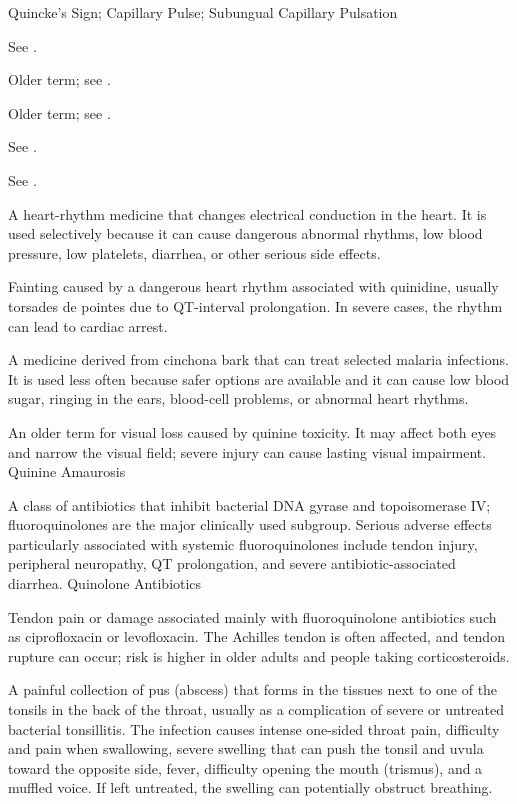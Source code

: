 \synonyms
Quincke's Sign; Capillary Pulse; Subungual Capillary Pulsation

 See .

 Older term; see .

 Older term; see .

 See .

 See .

 A heart-rhythm medicine that changes electrical conduction in the heart. It is used selectively because it can cause dangerous abnormal rhythms, low blood pressure, low platelets, diarrhea, or other serious side effects.

 Fainting caused by a dangerous heart rhythm associated with quinidine, usually torsades de pointes due to QT-interval prolongation. In severe cases, the rhythm can lead to cardiac arrest.

 A medicine derived from cinchona bark that can treat selected malaria infections. It is used less often because safer options are available and it can cause low blood sugar, ringing in the ears, blood-cell problems, or abnormal heart rhythms.

 An older term for visual loss caused by quinine toxicity. It may affect both eyes and narrow the visual field; severe injury can cause lasting visual impairment.
\synonyms
Quinine Amaurosis

 A class of antibiotics that inhibit bacterial DNA gyrase and topoisomerase IV; fluoroquinolones are the major clinically used subgroup. Serious adverse effects particularly associated with systemic fluoroquinolones include tendon injury, peripheral neuropathy, QT prolongation, and severe antibiotic-associated diarrhea.
\synonyms
Quinolone Antibiotics

 Tendon pain or damage associated mainly with fluoroquinolone antibiotics such as ciprofloxacin or levofloxacin. The Achilles tendon is often affected, and tendon rupture can occur; risk is higher in older adults and people taking corticosteroids.

 A painful collection of pus (abscess) that forms in the tissues next to one of the tonsils in the back of the throat, usually as a complication of severe or untreated bacterial tonsillitis. The infection causes intense one-sided throat pain, difficulty and pain when swallowing, severe swelling that can push the tonsil and uvula toward the opposite side, fever, difficulty opening the mouth (trismus), and a muffled voice. If left untreated, the swelling can potentially obstruct breathing.

